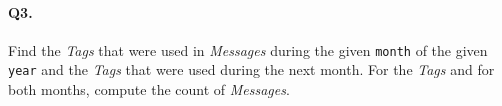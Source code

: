 \paragraph{Q3.}
Find the \emph{Tags} that were used in \emph{Messages} during the given
\texttt{month} of the given \texttt{year} and the \emph{Tags} that were
used during the next month.
For the \emph{Tags} and for both months, compute the count of
\emph{Messages}.
